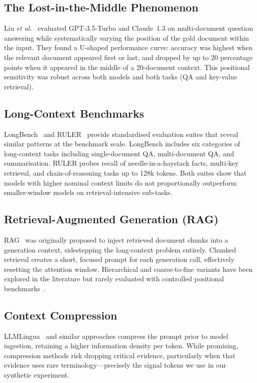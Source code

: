 \documentclass[sigconf,nonacm]{acmart}
\begin{document}
\subsection{The Lost-in-the-Middle Phenomenon}

Liu \emph{et al.}~\cite{liu2023lost} evaluated GPT-3.5-Turbo and Claude~1.3 on
multi-document question answering while systematically varying the position of
the gold document within the input.
They found a U-shaped performance curve: accuracy was highest when the relevant
document appeared first or last, and dropped by up to 20 percentage points when
it appeared in the middle of a 20-document context.
This positional sensitivity was robust across both models and both tasks
(QA and key-value retrieval).

\subsection{Long-Context Benchmarks}

LongBench~\cite{bai2024longbench} and RULER~\cite{hsieh2024ruler} provide
standardised evaluation suites that reveal similar patterns at the benchmark
scale.
LongBench includes six categories of long-context tasks including single-document
QA, multi-document QA, and summarisation.
RULER probes recall of needle-in-a-haystack facts, multi-key retrieval, and
chain-of-reasoning tasks up to 128k tokens.
Both suites show that models with higher nominal context limits do not
proportionally outperform smaller-window models on retrieval-intensive sub-tasks.

\subsection{Retrieval-Augmented Generation (RAG)}

RAG~\cite{lewis2020rag} was originally proposed to inject retrieved document
chunks into a generation context, sidestepping the long-context problem entirely.
Chunked retrieval creates a short, focused prompt for each generation call,
effectively resetting the attention window.
Hierarchical and coarse-to-fine variants have been explored in the literature
but rarely evaluated with controlled positional benchmarks~\cite{gao2023retrieval}.

\subsection{Context Compression}

LLMLingua~\cite{jiang2023llmlingua} and similar approaches compress the prompt
prior to model ingestion, retaining a higher information density per token.
While promising, compression methods risk dropping critical evidence,
particularly when that evidence uses rare terminology—precisely the signal
tokens we use in our synthetic experiment.
\end{document}
